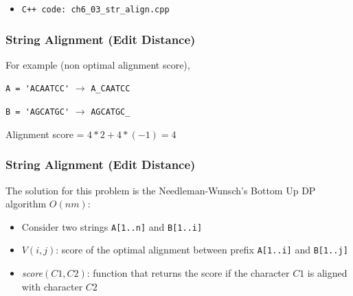 \documentclass{beamer}
\begin{document}
\vspace{0.3cm}

\begin{itemize}
    \item \color{red}\verb|C++ code: ch6_03_str_align.cpp|\color{black}
\end{itemize}

\begin{frame}[fragile]
\frametitle{String Alignment (Edit Distance)}

For example (non optimal alignment score),

\vspace{0.3cm}

\verb|A = 'ACAATCC'| $\rightarrow$ \verb|A_CAATCC| 

\verb|B = 'AGCATGC'| $\rightarrow$ \verb|AGCATGC_|

\color{blue}Alignment score = $4*2 + 4*(-1) = 4$\color{black}

\end{frame}

\begin{frame}[fragile]
\frametitle{String Alignment (Edit Distance)}

The solution for this problem is the Needleman-Wunsch's Bottom Up DP algorithm $O(nm)$: 

\begin{itemize}
    \item Consider two strings \verb|A[1..n]| and \verb|B[1..i]|
    \item $V(i,j)$: score of the optimal alignment between prefix \verb|A[1..i]| and \verb|B[1..j]|
    \item \textit{score}$(C1,C2)$: function that returns the score if the character $C1$ is aligned with character $C2$
\end{itemize}

\end{frame}
\end{document}
